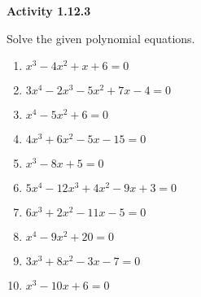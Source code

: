 \vspace{0.3ex}
\noindent\textbf{Activity 1.12.3}

\vspace{0.2ex}

Solve the given polynomial equations.
\begin{multicols}{2}
\begin{enumerate}
    \item $x^3 - 4x^2 + x + 6 = 0$
    \item $3x^4 - 2x^3 - 5x^2 + 7x - 4 = 0$
    \item $x^4 - 5x^2 + 6 = 0$
    \item $4x^3 + 6x^2 - 5x - 15 = 0$
    \item $x^3 - 8x + 5 = 0$
    \item $5x^4 - 12x^3 + 4x^2 - 9x + 3 = 0$
    \item $6x^3 + 2x^2 - 11x - 5 = 0$
    \item $x^4 - 9x^2 + 20 = 0$
    \item $3x^3 + 8x^2 - 3x - 7 = 0$
    \item $x^3 - 10x + 6 = 0$
    \end{enumerate}
    \end{multicols}
